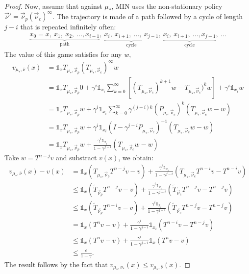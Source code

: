 \documentclass{article}
\def\1{{\mathds 1}}
\begin{document}
\begin{proof}
  Now, assume that against $\mu_*$, MIN uses the non-stationary policy $\vec\nu'=\vec\nu_p(\vec\nu_c)^\infty$. The trajectory is made of a path followed by a cycle of length $j-i$ that is repeated infinitely often:
  \begin{align}
    \underbrace{x_0=x,~ x_1,~ x_2,~ \dots, x_{i-1}}_{\mbox{path}},~ \underbrace{x_i,~ x_{i+1},~ \dots,~ x_{j-1}}_{\mbox{cycle}},~ \underbrace{x_i,~ x_{i+1},~ \dots, x_{j-1}}_{\mbox{cycle}}, ~\dots
  \end{align}
  The value of this game satisfies for any $w$,
  \begin{align}
    v_{\mu_*,\bar\nu}(x) & = \1_x T_{\mu_*,\vec\nu_p} (T_{\mu_*,\vec\nu_c})^\infty w \\
    & = \1_x  T_{\mu_*,\vec\nu_p} 0 + \gamma^i \1_{x_i} \sum_{k=0}^{\infty} [(T_{\mu_*,\vec\nu_c})^{k+1} w - T_{\mu_*,\vec\nu_c})^k w] + \gamma^i \1_{x_i} w \\
    & = \1_x  T_{\mu_*,\vec\nu_p} w + \gamma^i \1_{x_i} \sum_{k=0}^{\infty} \gamma^{(j-i)k}(P_{\mu_*,\vec\nu_c})^k (T_{\mu_*,\vec\nu_c} w -  w)  \\
    & = \1_x  T_{\mu_*,\vec\nu_p} w + \gamma^i \1_{x_i} (I-\gamma^{j-i} P_{\mu_*,\vec\nu_c})^{-1} (T_{\mu_*,\vec\nu_c} w -  w) \\
    &=\1_x  T_{\mu_*,\vec\nu_p} w + \frac{\gamma^i \1_{x_i}}{1-\gamma^{j-i}} (T_{\mu_*,\vec\nu_c} w -  w) 
  \end{align}
  Take $w=T^{n-j}v$ and substract $v(x)$, we obtain:
  \begin{align}
    v_{\mu_*,\bar\nu}(x) - v(x) & = \1_x  (T_{\mu_*,\vec\nu_p} T^{n-j}v-v) + \frac{\gamma^i \1_{x_i}}{1-\gamma^{j-i}} (T_{\mu_*,\vec\nu_c} T^{n-i}v -  T^{n-i}v )\\
    & \le \1_x  (\tilde T_{\vec\nu_p} T^{n-j}v - v)+ \frac{\gamma^i \1_{x_i}}{1-\gamma^{j-i}} (\tilde T_{\vec\nu_c} T^{n-j}v -  T^{n-j}v ) \\
    & \le \1_x  (\tilde T_{\vec\nu_p} T^{n-i}v - v)+ \frac{\gamma^i \1_{x_i}}{1-\gamma^{j-i}} (\tilde T_{\vec\nu_c} T^{n-j}v -  T^{n-j}v ) \\
    & = \1_x (T^nv - v) + \frac{\gamma^i}{1-\gamma^{j-i}}  \1_{x_i} (T^{n-i}v -  T^{n-j}v ) \\
    & \le \1_x (T^nv - v) + \frac{\gamma^i}{1-\gamma^{j-i}}  \1_x (T^n v - v) \\
    & \le \frac{\epsilon}{1-\gamma}.
  \end{align}
The result follows by the fact that $v_{\mu_*,\nu_*}(x) \le v_{\mu_*,\bar\nu}(x)$.
\end{proof}
\end{document}
